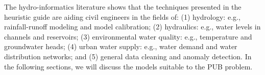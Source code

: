 The hydro-informatics literature shows that the techniques presented in the heuristic guide are aiding civil engineers in the fields of: (1) hydrology: e.g., rainfall-runoff modeling and model calibration; (2) hydraulics: e.g., water levels in channels and reservoirs; (3) environmental water quality: e.g., temperature and groundwater heads; (4) urban water supply: e.g., water demand and water distribution networks; and (5) general data cleaning and anomaly detection. In the following sections, we will discuss the models suitable to the PUB problem. 


%

